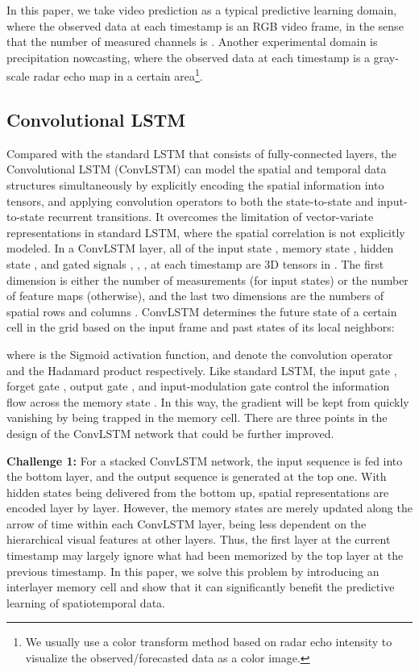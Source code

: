\documentclass[10pt,journal,compsoc]{IEEEtran}
\begin{document}
In this paper, we take video prediction as a typical predictive learning domain, where the observed data at each timestamp is an RGB video frame, in the sense that the number of measured channels is .
Another experimental domain is precipitation nowcasting, where the observed data at each timestamp is a gray-scale radar echo map in a certain area\footnote{
We usually use a color transform method based on radar echo intensity to visualize the observed/forecasted data as a color image.}. 


\subsection{Convolutional LSTM}


Compared with the standard LSTM that consists of fully-connected layers, the Convolutional LSTM (ConvLSTM) \cite{shi2015convolutional} can model the spatial and temporal data structures simultaneously by explicitly encoding the spatial information into tensors, and applying convolution operators to both the state-to-state and input-to-state recurrent transitions.
It overcomes the limitation of vector-variate representations in standard LSTM, where the spatial correlation is not explicitly modeled. 
In a ConvLSTM layer, all of the input state , memory state , hidden state , and gated signals , , ,  at each timestamp are 3D tensors in . The first dimension is either the number of measurements (for input states) or the number of feature maps (otherwise), and the last two dimensions are the numbers of spatial rows  and columns . 
ConvLSTM determines the future state of a certain cell in the  grid based on the input frame and past states of its local neighbors:

where  is the Sigmoid activation function,  and  denote the convolution operator and the Hadamard product respectively. 
Like standard LSTM, the input gate , forget gate , output gate , and input-modulation gate  control the information flow across the memory state . In this way, the gradient will be kept from quickly vanishing by being trapped in the memory cell.
There are three points in the design of the ConvLSTM network that could be further improved.

\textbf{Challenge 1:} For a stacked ConvLSTM network, the input sequence  is fed into the bottom layer, and the output sequence  is generated at the top one. With hidden states  being delivered from the bottom up, spatial representations are encoded layer by layer. However, the memory states  are merely updated along the arrow of time within each ConvLSTM layer, being less dependent on the hierarchical visual features at other layers.
Thus, the first layer at the current timestamp may largely ignore what had been memorized by the top layer at the previous timestamp. In this paper, we solve this problem by introducing an interlayer memory cell and show that it can significantly benefit the predictive learning of spatiotemporal data.
\end{document}
